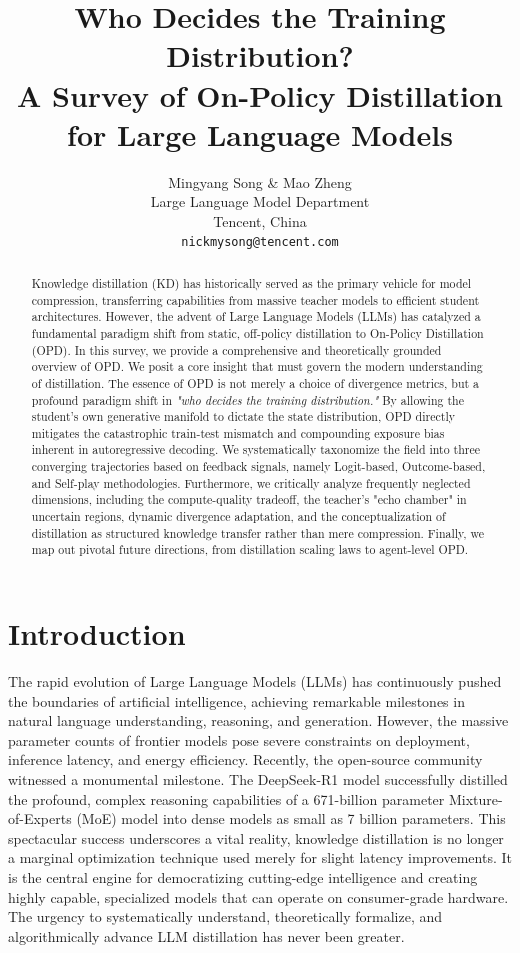 \documentclass{article} %
\title{Who Decides the Training Distribution? \\ A Survey of On-Policy Distillation for Large Language Models}
\author{Mingyang Song \& Mao Zheng \\
Large Language Model Department \\Tencent, China\\
\texttt{nickmysong@tencent.com}}
\begin{document}
\ifcolmsubmission
\linenumbers
\fi

\maketitle


\begin{abstract}
Knowledge distillation (KD) has historically served as the primary vehicle for model compression, transferring capabilities from massive teacher models to efficient student architectures. However, the advent of Large Language Models (LLMs) has catalyzed a fundamental paradigm shift from static, off-policy distillation to On-Policy Distillation (OPD). In this survey, we provide a comprehensive and theoretically grounded overview of OPD. We posit a core insight that must govern the modern understanding of distillation. The essence of OPD is not merely a choice of divergence metrics, but a profound paradigm shift in \textit{"who decides the training distribution."} By allowing the student's own generative manifold to dictate the state distribution, OPD directly mitigates the catastrophic train-test mismatch and compounding exposure bias inherent in autoregressive decoding. 
We systematically taxonomize the field into three converging trajectories based on feedback signals, namely Logit-based, Outcome-based, and Self-play methodologies. Furthermore, we critically analyze frequently neglected dimensions, including the compute-quality tradeoff, the teacher's "echo chamber" in uncertain regions, dynamic divergence adaptation, and the conceptualization of distillation as structured knowledge transfer rather than mere compression. Finally, we map out pivotal future directions, from distillation scaling laws to agent-level OPD.
\end{abstract}

\section{Introduction}
\label{sec:intro}

The rapid evolution of Large Language Models (LLMs) has continuously pushed the boundaries of artificial intelligence, achieving remarkable milestones in natural language understanding, reasoning, and generation. However, the massive parameter counts of frontier models pose severe constraints on deployment, inference latency, and energy efficiency. Recently, the open-source community witnessed a monumental milestone. The DeepSeek-R1 model \citep{2501.12948} successfully distilled the profound, complex reasoning capabilities of a 671-billion parameter Mixture-of-Experts (MoE) model into dense models as small as 7 billion parameters. This spectacular success underscores a vital reality, knowledge distillation is no longer a marginal optimization technique used merely for slight latency improvements. It is the central engine for democratizing cutting-edge intelligence and creating highly capable, specialized models that can operate on consumer-grade hardware. The urgency to systematically understand, theoretically formalize, and algorithmically advance LLM distillation has never been greater.
\end{document}
